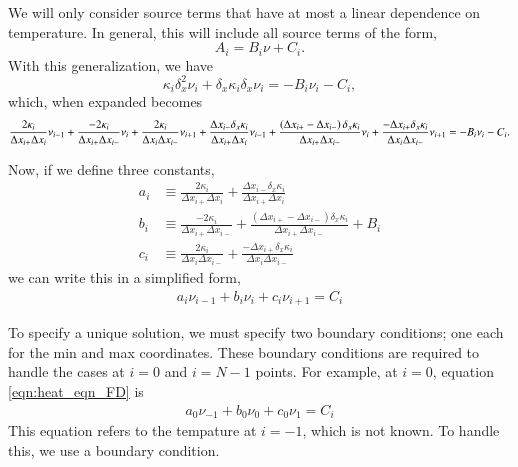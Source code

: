 \documentclass[letterpaper,12pt]{article}
\begin{document}
We will only consider source terms that have at most a linear dependence on temperature. In general, this will include all
source terms of the form,
\begin{equation}
  A_i = B_i \nu + C_i.
\end{equation}
With this generalization, we have
\begin{equation}
   \kappa_i \delta^2_x \nu_i
+  \delta_x \kappa_i \delta_x \nu_i
= -B_i \nu_i - C_i,
\end{equation}
which, when expanded becomes
\begin{equation}
   \frac{ 2 \kappa_i                                                     }{ \Delta x_{i+}\Delta x_{i } } \nu_{i-1}
 + \frac{-2 \kappa_i                                                     }{ \Delta x_{i+}\Delta x_{i-} } \nu_{i  }
 + \frac{ 2 \kappa_i                                                     }{ \Delta x_{i }\Delta x_{i-} } \nu_{i+1}
 + \frac{                        \Delta x_{i-}         \delta_x \kappa_i }{ \Delta x_{i+}\Delta x_{i } } \nu_{i-1}
 + \frac{ \left( \Delta x_{i+} - \Delta x_{i-} \right) \delta_x \kappa_i }{ \Delta x_{i+}\Delta x_{i-} } \nu_{i  }
 +\frac{        -\Delta x_{i+}                         \delta_x \kappa_i }{ \Delta x_{i }\Delta x_{i-} } \nu_{i+1} \\
= -B_i \nu_i - C_i.
\end{equation}

Now, if we define three constants,
\begin{align}
  a_i&\equiv \frac{ 2 \kappa_i }{ \Delta x_{i+}\Delta x_{i } }
           + \frac{ \Delta x_{i-} \delta_x \kappa_i }{ \Delta x_{i+}\Delta x_{i } } \\
  b_i&\equiv \frac{-2 \kappa_i }{ \Delta x_{i+}\Delta x_{i-} }
           + \frac{ \left( \Delta x_{i+} - \Delta x_{i-} \right) \delta_x \kappa_i }{ \Delta x_{i+}\Delta x_{i-} } 
           + B_i \\
  c_i&\equiv \frac{ 2 \kappa_i }{ \Delta x_{i }\Delta x_{i-} }
           + \frac{ -\Delta x_{i+}\delta_x \kappa_i }{ \Delta x_{i }\Delta x_{i-} }
\end{align}
we can write this in a simplified form,
\begin{align}
  \label{eqn:heat_eqn_FD}
  a_i \nu_{i-1}
 +b_i \nu_{i  }
 +c_i \nu_{i+1}
= C_i
\end{align}

To specify a unique solution, we must specify two boundary conditions; one each for the min and max coordinates.
These boundary conditions are required to handle the cases at $i=0$ and $i=N-1$ points. For example, at $i=0$, equation
\ref{eqn:heat_eqn_FD} is
\begin{align}
  \label{eqn:boundary_eqn}
  a_0 \nu_{-1}
 +b_0 \nu_{0  }
 +c_0 \nu_{1}
= C_i
\end{align}
This equation refers to the tempature at $i=-1$, which is not known. To handle this, we use a boundary condition.
\end{document}
